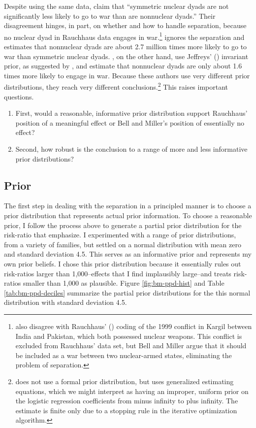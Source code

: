 \documentclass[12pt]{article}
\begin{document}
Despite using the same data, \citet[p. 9]{BellMiller2015} claim that ``symmetric nuclear dyads are not significantly less likely to go to war than are nonnuclear dyads.'' 
Their disagreement hinges, in part, on whether and how to handle separation, because no nuclear dyad in Rauchhaus data engages in war.\footnote{
\cite{BellMiller2015} also disagree with Rauchhaus' (\citeyear{Rauchhaus2009}) coding of the 1999 conflict in Kargil between India and Pakistan, which both possessed nuclear weapons. 
This conflict is excluded from Rauchhaus' data set, but Bell and Miller argue that it should be included as a war between two nuclear-armed states, eliminating the problem of separation.} 
\cite{Rauchhaus2009} ignores the separation and estimates that nonnuclear dyads are about 2.7 million times more likely to go to war than symmetric nuclear dyads.
\cite{BellMiller2015}, on the other hand, use Jeffreys' (\citeyear{Jeffreys1946}) invariant prior, as suggested by \cite{Zorn2005}, and estimate that nonnuclear dyads are only about 1.6 times more likely to engage in war. 
Because these authors use very different prior distributions, they reach very different conclusions.\footnote{
\cite{Rauchhaus2009} does not use a formal prior distribution, but uses generalized estimating equations, which we might interpret as having an improper, uniform prior on the logistic regression coefficients from minus infinity to plus infinity. 
The estimate is finite only due to a stopping rule in the iterative optimization algorithm.} 
This raises important questions. 
\begin{enumerate}
\item First, would a reasonable, informative prior distribution support Rauchhaus' position of a meaningful effect or Bell and Miller's position of essentially no effect? 
\item Second, how robust is the conclusion to a range of more and less informative prior distributions?
\end{enumerate}

\subsection*{Prior}

The first step in dealing with the separation in a principled manner is to choose a prior distribution that represents actual prior information. 
To choose a reasonable prior, I follow the process above to generate a partial prior distribution for the risk-ratio that \cite{BellMiller2015} emphasize. 
I experimented with a range of prior distributions, from a variety of families, but settled on a normal distribution with mean zero and standard deviation 4.5. 
This serves as an informative prior and represents my own prior beliefs.   
I chose this prior distribution because it essentially rules out risk-ratios larger than 1,000--effects that I find implausibly large--and treats risk-ratios smaller than 1,000 as plausible. 
Figure \ref{fig:bm-ppd-hist} and Table \ref{tab:bm-ppd-deciles} summarize the partial prior distributions for the this normal distribution with standard deviation 4.5.
\end{document}

